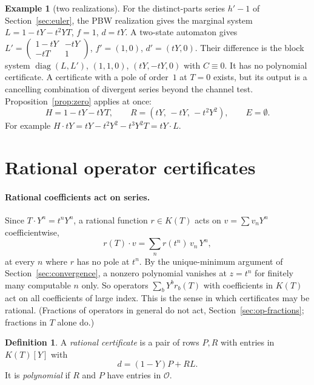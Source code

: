 \documentclass[11pt,a4paper]{article}
\newcommand{\Op}{\mathcal O}
\theoremstyle{plain}
\theoremstyle{definition}
\newtheorem{definition}[theorem]{Definition}
\newtheorem{example}[theorem]{Example}
\theoremstyle{remark}
\begin{document}
\begin{example}[two realizations]\label{ex:two-realizations}
For the distinct-parts series $h'-1$ of Section~\ref{sec:euler}, the PBW
realization gives the marginal system $L=1-tY-t^2YT$, $f=1$, $d=tY$. A two-state
automaton gives $L'=\left(\begin{smallmatrix}1-tY&-tY\\-tT&1\end{smallmatrix}\right)$,
$f'=(1,0)$, $d'=(tY,0)$. Their difference is the block system
$\operatorname{diag}(L,L')$, $(1,1,0)$, $(tY,-tY,0)$ with $C\equiv0$. It has no
polynomial certificate. A certificate with a pole of order~$1$ at $T=0$ exists,
but its output is a cancelling combination of divergent series beyond the
channel test.
Proposition~\ref{prop:zero} applies at once:
\[
  H=1-tY-tYT,\qquad R=(tY,\,-tY,\,-t^2Y^2),\qquad E=\emptyset.
\]
For example $H\cdot tY=tY-t^2Y^2-t^3Y^2T=tY\cdot L$.
\end{example}

\section{Rational operator certificates}\label{sec:polynomial}

\paragraph{Rational coefficients act on series.} Since $T\cdot Y^n=t^nY^n$, a
rational function $r\in K(T)$ acts on $v=\sum v_nY^n$ coefficientwise,
\[
  r(T)\cdot v=\sum_n r(t^n)\,v_n\,Y^n,
\]
at every $n$ where $r$ has no pole at $t^n$. By the unique-minimum argument of
Section~\ref{sec:convergence}, a nonzero polynomial vanishes at $z=t^n$ for
finitely many computable $n$ only. So operators $\sum_bY^br_b(T)$ with
coefficients in $K(T)$ act on all coefficients of large index. This is the sense
in which certificates may be rational. (Fractions of operators in general do
not act, Section~\ref{sec:op-fractions}; fractions in $T$ alone do.)

\begin{definition}
A \emph{rational certificate} is a pair of rows $P,R$ with entries in $K(T)[Y]$ with
\begin{equation}\label{eq:polycert}
  d=(1-Y)P+RL.
\end{equation}
It is \emph{polynomial} if $R$ and $P$ have entries in $\Op$.
\end{definition}
\end{document}
